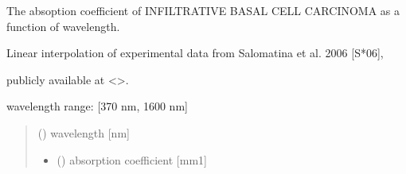 \documentclass[letterpaper,10pt,english]{sphinxmanual}
\begin{document}

\begin{fulllineitems}
\label{\detokenize{03_absorption_coefficient:skinoptics.absorption_coefficient.mua_iBCC_Salomatina}}
\pysigstartsignatures
{}
\pysigstopsignatures
\begin{DUlineblock}{0em}
\item[] The absoption coefficient of INFILTRATIVE BASAL CELL CARCINOMA as a function of wavelength.
\item[] Linear interpolation of experimental data from Salomatina et al. 2006 {[}S*06{]},
\item[] publicly available at \textless{}\textgreater{}.
\end{DUlineblock}

\begin{DUlineblock}{0em}
\item[] wavelength range: {[}370 nm, 1600 nm{]}
\end{DUlineblock}
\begin{quote}\begin{description}
\sphinxAtStartPar
{} () \textendash{} wavelength {[}nm{]}

\sphinxAtStartPar
\begin{itemize}
\item {} 
\sphinxAtStartPar
{} () \textendash{} absorption coefficient {[}mm\sphinxhyphen{}1{]}

\end{itemize}


\end{description}\end{quote}

\end{fulllineitems}

\end{document}
